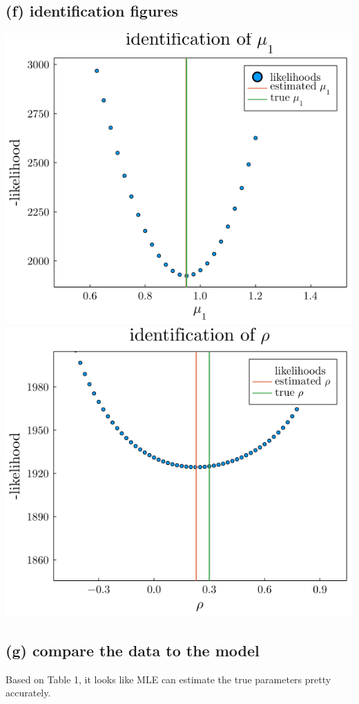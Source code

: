 \documentclass[12pt]{article}
\begin{document}
\subsection*{(f) identification figures}
\begin{center}
\includegraphics[scale = 0.5]{output/mu_id.png}
\\
\includegraphics[scale = 0.5]{output/rho_id.png}
\end{center}

\subsection*{(g) compare the data to the model}
Based on Table 1, it looks like MLE can estimate the true parameters pretty accurately.

\end{document}
